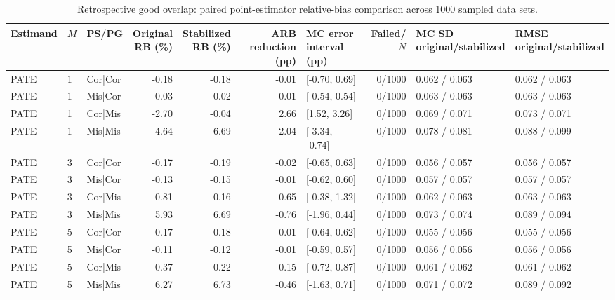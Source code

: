 \begin{table}
\centering\footnotesize
\caption{Retrospective good overlap: paired point-estimator relative-bias comparison across 1000 sampled data sets.}
\setlength{\tabcolsep}{3pt}
\renewcommand{\arraystretch}{1.12}
\begin{tabular}{lllr r r l r l l}
\toprule
Estimand & $M$ & PS/PG & \shortstack{Original\\RB (\%)} & \shortstack{Stabilized\\RB (\%)} & \shortstack{ARB reduction\\(pp)} & \shortstack{MC error interval\\(pp)} & Failed/$N$ & \shortstack{MC SD\\original/stabilized} & \shortstack{RMSE\\original/stabilized} \\
\midrule
PATE & 1 & Cor|Cor & -0.18 & -0.18 & -0.01 & [-0.70, 0.69] & 0/1000 & 0.062 / 0.063 & 0.062 / 0.063 \\
PATE & 1 & Mis|Cor & 0.03 & 0.02 & 0.01 & [-0.54, 0.54] & 0/1000 & 0.063 / 0.063 & 0.063 / 0.063 \\
PATE & 1 & Cor|Mis & -2.70 & -0.04 & 2.66 & [1.52, 3.26] & 0/1000 & 0.069 / 0.071 & 0.073 / 0.071 \\
PATE & 1 & Mis|Mis & 4.64 & 6.69 & -2.04 & [-3.34, -0.74] & 0/1000 & 0.078 / 0.081 & 0.088 / 0.099 \\
PATE & 3 & Cor|Cor & -0.17 & -0.19 & -0.02 & [-0.65, 0.63] & 0/1000 & 0.056 / 0.057 & 0.056 / 0.057 \\
PATE & 3 & Mis|Cor & -0.13 & -0.15 & -0.01 & [-0.62, 0.60] & 0/1000 & 0.057 / 0.057 & 0.057 / 0.057 \\
PATE & 3 & Cor|Mis & -0.81 & 0.16 & 0.65 & [-0.38, 1.32] & 0/1000 & 0.062 / 0.063 & 0.063 / 0.063 \\
PATE & 3 & Mis|Mis & 5.93 & 6.69 & -0.76 & [-1.96, 0.44] & 0/1000 & 0.073 / 0.074 & 0.089 / 0.094 \\
PATE & 5 & Cor|Cor & -0.17 & -0.18 & -0.01 & [-0.64, 0.62] & 0/1000 & 0.055 / 0.056 & 0.055 / 0.056 \\
PATE & 5 & Mis|Cor & -0.11 & -0.12 & -0.01 & [-0.59, 0.57] & 0/1000 & 0.056 / 0.056 & 0.056 / 0.056 \\
PATE & 5 & Cor|Mis & -0.37 & 0.22 & 0.15 & [-0.72, 0.87] & 0/1000 & 0.061 / 0.062 & 0.061 / 0.062 \\
PATE & 5 & Mis|Mis & 6.27 & 6.73 & -0.46 & [-1.63, 0.71] & 0/1000 & 0.071 / 0.072 & 0.089 / 0.092 \\

\end{tabular}
\end{table}
